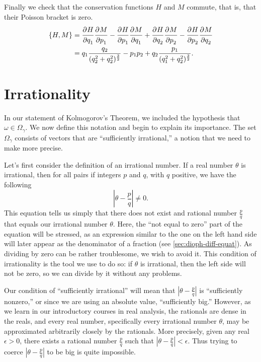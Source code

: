 \documentclass[twoside,letterpaper,10pt]{article}
\numberwithin{equation}{section}
\begin{document}
Finally we check that the conservation functions $H$ and $M$ commute, that is,
that their Poisson bracket is zero.
\begin{align*}
  \{H, M\} &= \frac{\strut\partial^{}H}{\strut\partial q_1^{}} \frac{\strut\partial^{}M}{\strut\partial p_1^{}} - \frac{\strut\partial^{}H}{\strut\partial p_1^{}} \frac{\strut\partial^{}M}{\strut\partial q_1^{}} + \frac{\strut\partial^{}H}{\strut\partial q_2^{}}
             \frac{\strut\partial^{}M}{\strut\partial p_2^{}} - \frac{\strut\partial^{}H}{\strut\partial p_2^{}} \frac{\strut\partial^{}M}{\strut\partial q_2^{}}\\
  &= q_1\frac{q_2}{(q_2^2 + q_2^2)^{\frac{3}{2}}} - p_1 p_2 + q_2
    \frac{p_1}{(q_1^2 + q_2^2)^{\frac{3}{2}}}.
\end{align*}

\section{Irrationality}
\label{sec:irrationality}

In our statement of Kolmogorov's Theorem, we included the hypothesis that
$\omega \in \Omega_{\gamma}$.
We now define this notation and begin to explain its importance.
The set $\Omega_{\gamma}$ consists of vectors that are ``sufficiently
irrational,'' a notion that we need to make more precise.

Let's first consider the definition of an irrational number.
If a real number $\theta$ is irrational, then for all pairs if integers $p$ and
$q$, with $q$ positive, we have the following
\begin{equation*}
  \left| \theta - \frac{p}{q} \right| \neq 0.
\end{equation*}
This equation tells us simply that there does not exist and rational number
$\frac{p}{q}$ that equals our irrational number $\theta$.
Here, the ``not equal to zero'' part of the equation will be stressed, as an
expression similar to the one on the left hand side will later appear as the
denominator of a fraction (see \cref{sec:dioph-diff-equat}).
As dividing by zero can be rather troublesome, we wish to avoid it.
This condition of irrationality is the tool we use to do so: if $\theta$ is
irrational, then the left side will not be zero, so we can divide by it without
any problems.

Our condition of ``sufficiently irrational'' will mean that $\left| \theta -
  \frac{p}{q} \right|$ is ``sufficiently nonzero,'' or since we are using an
absolute value, ``sufficiently big.''
However, as we learn in our introductory courses in real analysis, the rationals
are dense in the reals, and every real number, specifically every irrational
number $\theta$, may be approximated arbitrarily closely by the rationals.
More precisely, given any real $\epsilon > 0$, there exists a rational number
$\frac{p}{q}$ such that $\left| \theta - \frac{p}{q} \right| < \epsilon$.
Thus trying to coerce $\left| \theta - \frac{p}{q} \right|$ to be big is quite
impossible.
\end{document}
